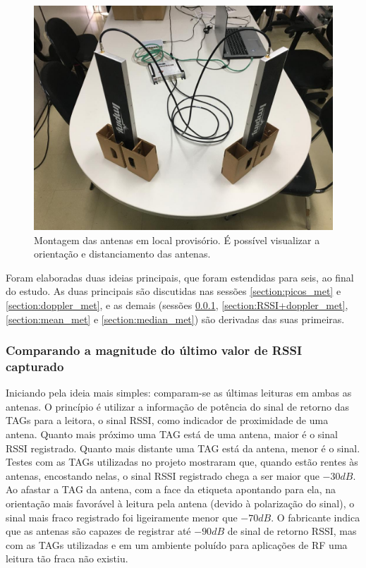   \begin{figure}[H]
    \centering
    \includegraphics[width=0.6\linewidth]{figs/Metodologia/antenas1.jpeg}
    \caption{Montagem das antenas em local provisório. É possível visualizar a orientação e distanciamento das antenas.}
    \label{fig:antenas1}
\end{figure}
 
 Foram elaboradas duas ideias principais, que foram estendidas para seis, ao final do estudo. As duas principais são discutidas nas sessões \ref{section:picos_met} e \ref{section:doppler_met}, e as demais (sessões \ref{section:ultimo_valor_met}, \ref{section:RSSI+doppler_met}, \ref{section:mean_met} e \ref{section:median_met}) são derivadas das suas primeiras.

 \subsubsection{Comparando a magnitude do último valor de RSSI capturado} \label{section:ultimo_valor_met}
 
 Iniciando pela ideia mais simples: comparam-se as últimas leituras em ambas as antenas. O princípio é utilizar a informação de potência do sinal de retorno das TAGs para a leitora, o sinal RSSI, como indicador de proximidade de uma antena. Quanto mais próximo uma TAG está de uma antena, maior é o sinal RSSI registrado. Quanto mais distante uma TAG está da antena, menor é o sinal. Testes com as TAGs utilizadas no projeto mostraram que, quando estão rentes às antenas, encostando nelas, o sinal RSSI registrado chega a ser maior que $-30dB$. Ao afastar a TAG da antena, com a face da etiqueta apontando para ela, na orientação mais favorável à leitura pela antena (devido à polarização do sinal), o sinal mais fraco registrado foi ligeiramente menor que $-70dB$. O fabricante indica que as antenas são capazes de registrar até $-90dB$ de sinal de retorno RSSI, mas com as TAGs utilizadas e em um ambiente poluído para aplicações de RF uma leitura tão fraca não existiu.
 
